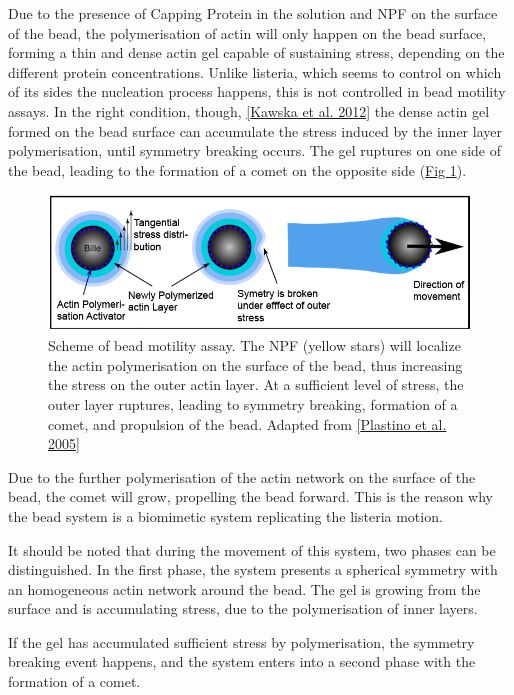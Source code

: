\documentclass[A4paperpaper,11pt,english]{sphinxmanual}
\begin{document}
Due to the presence of Capping Protein in the solution and NPF on the surface of
the bead, the polymerisation of actin will only happen
on the bead surface, forming a thin and dense actin gel capable of sustaining stress, depending
on the different protein concentrations. Unlike listeria, which
seems to control on which of its sides the nucleation process happens, this is not
controlled in bead motility assays. In the right condition, though,
{\hyperref[index-latex:kawska2012]{{[}Kawska et al. 2012{]}}} the dense actin gel formed on the bead surface can
accumulate the stress induced by the inner layer polymerisation, until symmetry
breaking occurs. The gel ruptures on one side of the bead, leading to
the formation of a comet on the opposite side (\hyperref[index-latex:fig-bead-motility]{Fig  \ref*{index-latex:fig-bead-motility}}).
\begin{figure}[htbp]
\centering
\capstart

\includegraphics[width=0.600\linewidth]{Plastino-Sykes-2005.png}
\caption{Scheme of bead motility assay. The NPF (yellow stars) will localize the
actin polymerisation on the surface of the bead, thus increasing the stress on
the outer actin layer. At a sufficient level of stress, the outer layer
ruptures, leading to symmetry breaking, formation of a comet, and
propulsion of the bead. Adapted from {\hyperref[index-latex:plastino2005]{{[}Plastino et al. 2005{]}}}}\label{index-latex:fig-bead-motility}\end{figure}

Due to the further polymerisation of the actin network on the surface of the bead,
the comet will grow, propelling the bead forward. This is the reason why the bead
system is a biomimetic system replicating the listeria motion.

It should be noted that during the movement of this system, two phases can be
distinguished. In the first phase, the system presents a spherical symmetry with
an homogeneous actin  network around the bead. The gel is growing from the
surface and is accumulating stress, due to the polymerisation of inner layers.

If the gel has accumulated sufficient stress by polymerisation,  the symmetry breaking event happens, and the system enters into
a second phase with the formation of a comet.
\end{document}
